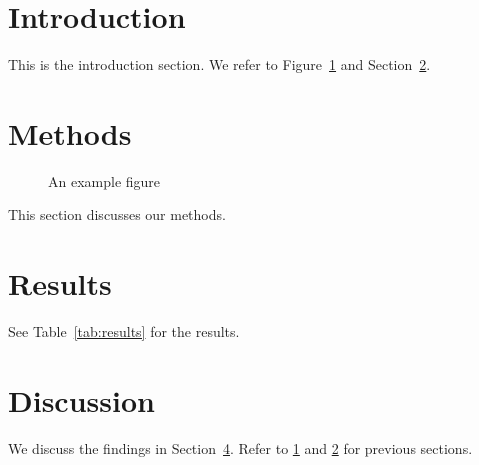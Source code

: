 \documentclass{article}
\begin{document}
\section{Introduction}
\label{sec:intro}

This is the introduction section. We refer to Figure~\ref{fig:example} and Section~\ref{sec:methods}.


\section{Methods}
\label{sec:methods}

\begin{figure}
\caption{An example figure}
\label{fig:example}
\end{figure}

This section discusses our methods.

\section{Results}
See Table~\ref{tab:results} for the results.

\label{orphaned_section}

\section{Discussion}
\label{sec:discussion}

We discuss the findings in Section~\ref{sec:discussion}. Refer to \ref{sec:intro} and \ref{sec:methods} for previous sections.
\end{document}
